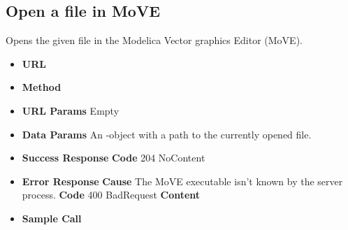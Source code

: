 \subsection{Open a file in MoVE}
Opens the given file in the Modelica Vector graphics Editor (MoVE).

\begin{itemize}
\item \textbf{URL} 
\item \textbf{Method} 

\item \textbf{URL Params} Empty

\item \textbf{Data Params} An -object with a path to the currently opened file.

\item \textbf{Success Response}
  \newline\textbf{Code} 204 NoContent

\item \textbf{Error Response}
  \newline\textbf{Cause} The MoVE executable isn't known by the server process.
  \newline\textbf{Code} 400 BadRequest
  \newline\textbf{Content} 

\item \textbf{Sample Call}
\end{itemize}
